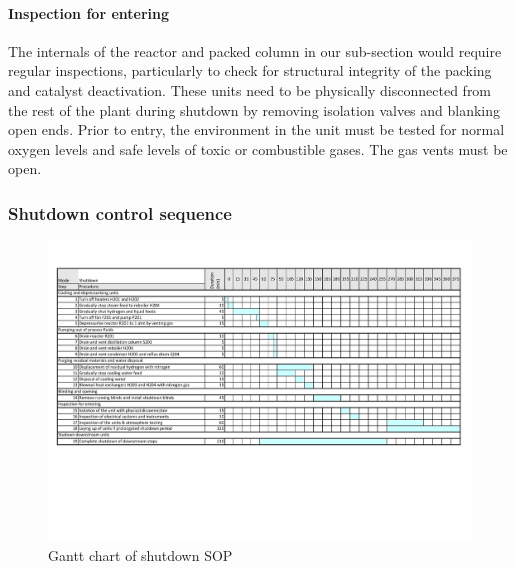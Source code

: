 \paragraph{Inspection for entering}
The internals of the reactor and packed column in our sub-section would require regular inspections, particularly to check for structural integrity of the packing and catalyst deactivation. These units need to be physically disconnected from the rest of the plant during shutdown by removing isolation valves and blanking open ends. Prior to entry, the environment in the unit must be tested for normal oxygen levels and safe levels of toxic or combustible gases. The gas vents must be open. 


\subsubsection{Shutdown control sequence}
\begin{figure}[h]
    \centering
    \includegraphics[clip, trim= 0.5cm 6cm 0.5cm 1cm, width=\linewidth]{chapters/4-operation-control/4-Figures/Shutdown.pdf}
    \caption{Gantt chart of shutdown SOP}
    \label{fig:shutdown}
\end{figure}


